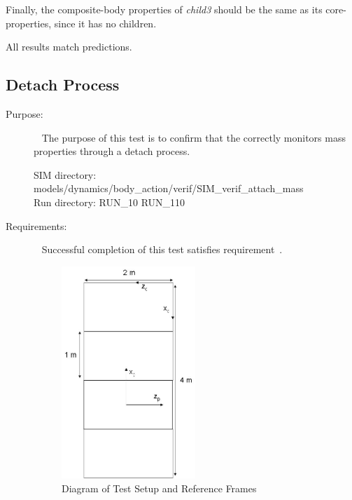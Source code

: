 \begin{description}
Finally, the composite-body properties of \textit{child3} should be the same 
as its core-properties, since it has no children.

All results match predictions.

\end{description}

\clearpage






\subsection{Detach Process}
\label{test:mass_10}
\begin{description}
\item[Purpose:] \ \newline
The purpose of this test is to confirm that the \ModelDesc
correctly monitors mass properties through a detach process.

SIM directory: models/dynamics/body\_action/verif/SIM\_verif\_attach\_mass\\
Run directory: RUN\_10 RUN\_110

\item[Requirements:] \ \newline
Successful completion of this test satisfies
requirement~.

\begin{figure}[h]
\begin{center}
\includegraphics[height=80mm]{pics/4stack_x_rot.jpg}
\caption{Diagram of Test Setup and Reference Frames}
\label{fig:4body_axis_2}
\end{center}
\end{figure}


\end{description}
